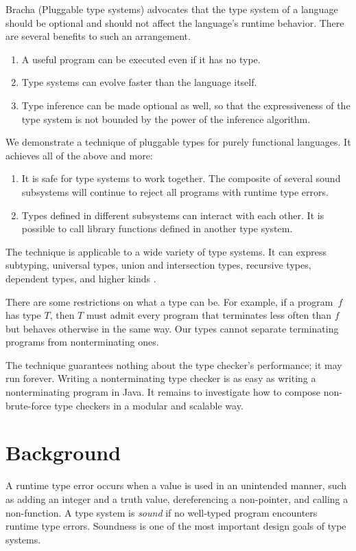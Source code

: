 \documentclass{amsart}
\theoremstyle{definition}
\def\thingsExpressibleInMpsModel{%
subtyping, universal types, union and intersection types,
recursive types, dependent types, and higher kinds%
}
\begin{document}
Bracha (Pluggable type systems) advocates that the type system of
a language should be optional and should not affect the
language's runtime behavior. There are several benefits to such
an arrangement.
\begin{enumerate}
\item A useful program can be executed even if it has no type.
\item Type systems can evolve faster than the language itself.
\item Type inference can be made optional as well, so that the
expressiveness of the type system is not bounded by the power of
the inference algorithm.
\end{enumerate}
We demonstrate a technique of pluggable types for purely
functional languages. It achieves all of the above and more:
\begin{enumerate}\setcounter{enumi}3
\item It is safe for type systems to work together. The composite
of several sound subsystems will continue to reject all programs
with runtime type errors.
\item Types defined in different subsystems can interact with
each other. It is possible to call library functions defined in
another type system.
\end{enumerate}
The technique is applicable to a wide variety of type systems. It
can express \thingsExpressibleInMpsModel.

There are some restrictions on what a type can be. For example,
if a program~$f$ has type $T$, then $T$ must admit every program
that terminates less often than $f$ but behaves otherwise in the
same way. Our types cannot separate terminating programs from
nonterminating ones.

The technique guarantees nothing about the type checker's
performance; it may run forever. Writing a nonterminating type
checker is as easy as writing a nonterminating program in Java.
It remains to investigate how to compose non-brute-force type
checkers in a modular and scalable way.

\section{Background}

A runtime type error occurs when a value is used in an unintended
manner, such as adding an integer and a truth value,
dereferencing a non-pointer, and calling a non-function. A type
system is \emph{sound} if no well-typed program encounters
runtime type errors. Soundness is one of the most important
design goals of type systems.
\end{document}

